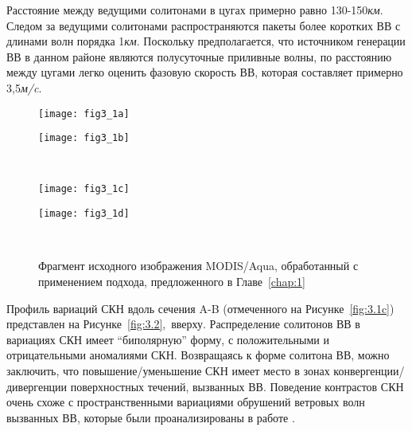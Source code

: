 {Расстояние между ведущими солитонами в цугах примерно равно 130-150\textit{км}. Следом за ведущими солитонами распространяются пакеты более коротких ВВ с длинами волн порядка 1\textit{км}. Поскольку предполагается, что источником генерации ВВ в данном районе являются полусуточные приливные волны, по расстоянию между цугами легко оценить фазовую скорость ВВ, которая составляет примерно 3,5\textit{м/c}.



\begin{figure}[H]
   	\centering
	\begin{minipage}{.47\textwidth}
	    \subcaptionbox{\label{fig:3.1a}}
		{\texttt{[image: fig3\_1a]}}
	\end{minipage}
	\hfill
	\begin{minipage}{.47\textwidth}
	    \subcaptionbox{\label{fig:3.1b}}
		{\texttt{[image: fig3\_1b]}}
	\end{minipage}
	\\
	\begin{minipage}{.47\textwidth}
	    \subcaptionbox{\label{fig:3.1c}}
		{\texttt{[image: fig3\_1c]}}
	\end{minipage}
	\hfill
	\begin{minipage}{.47\textwidth}
	    \subcaptionbox{\label{fig:3.1d}}
		{\texttt{[image: fig3\_1d]}}
	\end{minipage}
    \\
    \caption{Фрагмент исходного изображения MODIS/Aqua, обработанный с применением подхода, предложенного в Главе~\ref{chap:1}}
    \label{fig:3.1}
\end{figure}


Профиль вариаций СКН вдоль сечения A-B (отмеченного на Рисунке~\ref{fig:3.1c}) представлен на Рисунке~\ref{fig:3.2},~вверху. Распределение солитонов ВВ в вариациях СКН имеет ``биполярную'' форму, с положительными и отрицательными аномалиями СКН. Возвращаясь к форме солитона ВВ, можно заключить, что повышение/уменьшение СКН имеет место в зонах конвергенции/дивергенции поверхностных течений, вызванных ВВ. Поведение контрастов СКН очень схоже с пространственными вариациями обрушений ветровых волн вызванных ВВ, которые были проанализированы в работе \citep{1986}.



}
